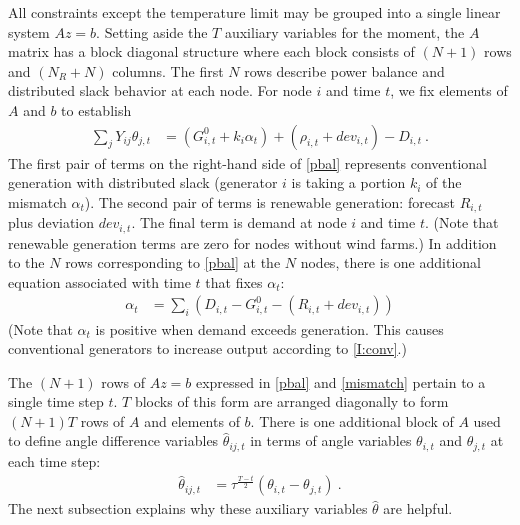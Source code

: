 \documentclass[conference]{IEEEtran}
\begin{document}
All constraints except the temperature limit may be grouped into a single linear system $Az=b$. Setting aside the $T$ auxiliary variables for the moment, the $A$ matrix has a block diagonal structure where each block consists of $(N+1)$ rows and $(N_R+N)$ columns. The first $N$ rows describe power balance and distributed slack behavior at each node. For node $i$ and time $t$, we fix elements of $A$ and $b$ to establish
\begin{align}\label{pbal}
\sum\limits_{j} Y_{ij}\theta_{j,t}  &= (G_{i,t}^0 + k_i\alpha_t) + (\rho_{i,t} + dev_{i,t}) - D_{i,t}~.
\end{align}
The first pair of terms on the right-hand side of \eqref{pbal} represents conventional generation with distributed slack (generator $i$ is taking a portion $k_i$ of the mismatch $\alpha_t$). The second pair of terms is renewable generation: forecast $R_{i,t}$ plus deviation $dev_{i,t}$. The final term is demand at node $i$ and time $t$. (Note that renewable generation terms are zero for nodes without wind farms.) In addition to the $N$ rows corresponding to \eqref{pbal} at the $N$ nodes, there is one additional equation associated with time $t$ that fixes $\alpha_t$:
\begin{align}\label{mismatch}
 \alpha_t &= \sum_i \left(D_{i,t} - G_{i,t}^0 - (R_{i,t} + dev_{i,t})\right)
\end{align}
(Note that $\alpha_t$ is positive when demand exceeds generation. This causes conventional generators to increase output according to \eqref{I:conv}.)

The $(N+1)$ rows of $Az=b$ expressed in \eqref{pbal} and \eqref{mismatch} pertain to a single time step $t$. $T$ blocks of this form are arranged diagonally to form $(N+1)T$ rows of $A$ and elements of $b$. There is one additional block of $A$ used to define angle difference variables $\hat{\theta}_{ij,t}$ in terms of angle variables $\theta_{i,t}$ and $\theta_{j,t}$ at each time step:
\begin{align}\label{thetahat}
\hat{\theta}_{ij,t} &= \tau^{\frac{T-t}{2}}(\theta_{i,t} - \theta_{j,t})~.
\end{align}
The next subsection explains why these auxiliary variables $\hat{\theta}$ are helpful.
\end{document}
